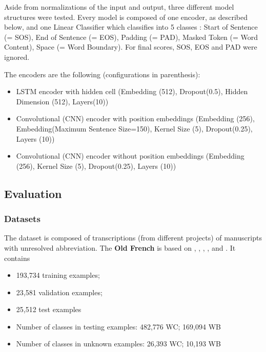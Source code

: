 \documentclass{jdmdh}
\begin{document}
Aside from normalizations of the input and output, three different model structures were tested. Every model is composed of one encoder, as described below, and one Linear Classifier which classifies into 5 classes : Start of Sentence (= SOS), End of Sentence (= EOS), Padding (= PAD), Masked Token (= Word Content), Space (= Word Boundary). For final scores, SOS, EOS and PAD were ignored.

The encoders are the following (configurations in parenthesis):

\begin{itemize}
  \item LSTM encoder with hidden cell (Embedding (512), Dropout(0.5), Hidden Dimension (512), Layers(10))
  \item Convolutional (CNN) encoder with position embeddings (Embedding (256), Embedding(Maximum Sentence Size=150), Kernel Size (5), Dropout(0.25), Layers (10))
  \item Convolutional (CNN) encoder without position embeddings (Embedding (256), Kernel Size (5), Dropout(0.25), Layers (10))
\end{itemize}

\subsection{Evaluation}

\subsubsection{Datasets}

The dataset is composed of transcriptions (from different projects) of manuscripts with unresolved abbreviation. The \textbf{Old French} is based on \citet{8269990}, \citet{pinche:hal-01628533}, \citet{jean_baptiste_camps_2019_2630574}, \citet{bfmmss}, and \citet{tnah_transcription}. It contains

\begin{itemize}
    \item 193,734 training examples;
    \item 23,581 validation examples;
    \item 25,512 test examples
    \item Number of classes in testing examples: 482,776 WC; 169,094 WB
    \item Number of classes in unknown examples: 26,393 WC; 10,193 WB
\end{itemize}
\end{document}
